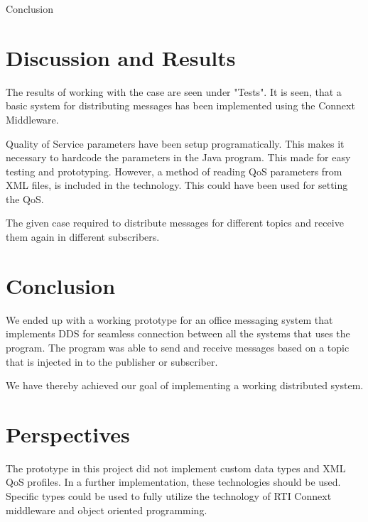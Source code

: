 {Conclusion}
\section{Discussion and Results}
The results of working with the case are seen under "Tests". It is seen, that a basic system for distributing messages has been implemented using the Connext Middleware. 

Quality of Service parameters have been setup programatically. This makes it necessary to hardcode the parameters in the Java program. This made for easy testing and prototyping. However, a method of reading QoS parameters from XML files, is included in the technology. This could have been used for setting the QoS.

The given case required to distribute messages for different topics and receive them again in different subscribers.

\section{Conclusion}
We ended up with a working prototype for an office messaging system that implements DDS for seamless connection between all the systems that uses the program.
The program was able to send and receive messages based on a topic that is injected in to the publisher or subscriber.

We have thereby achieved our goal of implementing a working distributed system.

\section{Perspectives}
The prototype in this project did not implement custom data types and XML QoS profiles. In a further implementation, these technologies should be used. Specific types could be used to fully utilize the technology of RTI Connext middleware and object oriented programming. 
